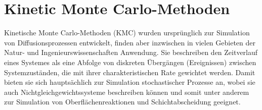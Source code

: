 \section{Kinetic Monte Carlo-Methoden}
\label{kmc}

Kinetische Monte Carlo-Methoden (KMC) wurden ursprünglich zur Simulation von Diffusionsprozessen entwickelt, finden aber inzwischen in vielen Gebieten der Natur- und Ingenieurswissenschaften Anwendung.
Sie beschreiben den Zeitverlauf eines Systemes als eine Abfolge von diskreten Übergängen (Ereignissen) zwischen Systemzuständen, die mit ihrer charakteristischen Rate gewichtet werden.
Damit bieten sie sich hauptsächlich zur Simulation stochastischer Prozesse an, wobei sie auch Nichtgleichgewichtssysteme beschreiben können und somit unter anderem zur Simulation von Oberflächenreaktionen und Schichtabscheidung geeignet.

